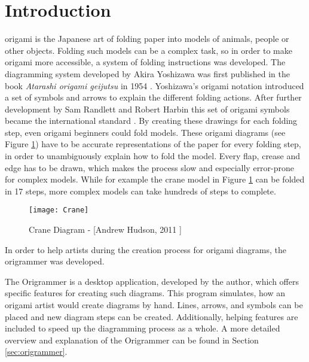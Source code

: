 
\section{Introduction}
\label{sec:introduction}

\gls{origami} is the Japanese art of folding paper into models of animals, people or other objects. Folding such models can be a complex task, so in order to make origami more accessible, a system of folding instructions was developed. The diagramming system developed by Akira Yoshizawa was first published in the book \emph{Atarashi origami geijutsu} in 1954 \cite{Yoshizawa}. Yoshizawa's origami notation introduced a set of symbols and arrows to explain the different folding actions. After further development by Sam Randlett and Robert Harbin this set of origami symbols became the international standard \cite{origamiHistoryWu} \cite{origamiHistoryK}.
By creating these drawings for each folding step, even origami beginners could fold models. These origami diagrams (see Figure \ref{fig:craneDiagram}) have to be accurate representations of the paper for every folding step, in order to unambiguously explain how to fold the model. Every flap, crease and edge has to be drawn, which makes the process slow and especially error-prone for complex models. While for example the crane model in Figure \ref{fig:craneDiagram} can be folded in 17 steps, more complex models can take hundreds of steps to complete. 

\begin{figure}[htbp]
	\centering
	\texttt{[image: Crane]}
	\caption[Crane Diagram]{Crane Diagram - [Andrew Hudson, 2011 \cite{Hudson}]}
	\label{fig:craneDiagram}
\end{figure}

\noindent In order to help artists during the creation process for origami diagrams, the \gls{origrammer} \cite{origrammer} was developed.

The Origrammer is a desktop application, developed by the author, which offers specific features for creating such diagrams. This program simulates, how an origami artist would create diagrams by hand. Lines, arrows, and symbols can be placed and new diagram steps can be created. Additionally, helping features are included to speed up the diagramming process as a whole. A more detailed overview and explanation of the Origrammer can be found in Section \ref{sec:origrammer}.

